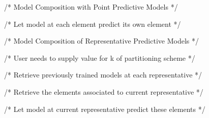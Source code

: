 \begin{itemize}
\begin{itemize}
\begin{algorithm}[h!]
\begin{algorithmic}[1]

/* Model Composition with Point Predictive Models */

    
    /* Let model at each element predict its own element */
    
\EndIf

/* Model Composition of Representative Predictive Models */

    /* User needs to supply value for k of partitioning scheme */
    
    /* Retrieve previously trained models at each representative */
    
    
        /* Retrieve the elements associated to current representative */
        
        /* Let model at current representative predict these elements */
    \EndFor

\EndIf


    
    

        
            


\end{algorithmic}
\end{algorithm}
\end{itemize}
\end{itemize}
